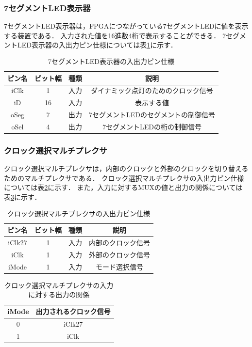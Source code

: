 \documentclass[a4paper,11pt]{ltjsarticle}
\begin{document}
\subsubsection{7セグメントLED表示器}
7セグメントLED表示器は，FPGAにつながっている7セグメントLEDに値を表示する装置である．
入力された値を16進数4桁で表示することができる．
7セグメントLED表示器の入出力ピン仕様については表\ref{tab:7seg}に示す．
\begin{table}[H]
    \centering
    \caption{7セグメントLED表示器の入出力ピン仕様}
    \label{tab:7seg}
    \begin{tabular}{|c|c|c|c|}
        \hline
        ピン名  & ビット幅 & 種類 & 説明                   \\
        \hline
        iClk & 1    & 入力 & ダイナミック点灯のためのクロック信号   \\
        \hline
        iD   & 16   & 入力 & 表示する値                \\
        \hline
        oSeg & 7    & 出力 & 7セグメントLEDのセグメントの制御信号 \\
        \hline
        oSel & 4    & 出力 & 7セグメントLEDの桁の制御信号     \\
        \hline
    \end{tabular}
\end{table}
\subsubsection{クロック選択マルチプレクサ}
クロック選択マルチプレクサは，内部のクロックと外部のクロックを切り替えるためのマルチプレクサである．
クロック選択マルチプレクサの入出力ピン仕様については表\ref{tab:clk_mux}に示す．
また，入力に対するMUXの値と出力の関係については表\ref{tab:clk_mux_value}に示す．
\begin{table}[H]
    \centering
    \caption{クロック選択マルチプレクサの入出力ピン仕様}
    \label{tab:clk_mux}
    \begin{tabular}{|c|c|c|c|}
        \hline
        ピン名    & ビット幅 & 種類 & 説明        \\
        \hline
        iClk27 & 1    & 入力 & 内部のクロック信号 \\
        \hline
        iClk   & 1    & 入力 & 外部のクロック信号 \\
        \hline
        iMode  & 1    & 入力 & モード選択信号   \\
        \hline
    \end{tabular}
\end{table}
\begin{table}[H]
    \centering
    \caption{クロック選択マルチプレクサの入力に対する出力の関係}
    \label{tab:clk_mux_value}
    \begin{tabular}{|c|c|}
        \hline
        iMode & 出力されるクロック信号 \\
        \hline
        0     & iClk27      \\
        \hline
        1     & iClk        \\
        \hline
    \end{tabular}
\end{table}
\end{document}
